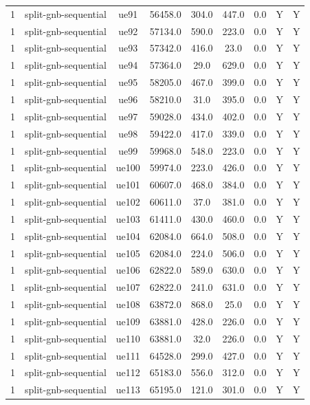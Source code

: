 \begin{table}[ht]
\begin{tabular}{|c|c|c|c|c|c|c|c|c|}
1 & split-gnb-sequential & ue91 & 56458.0 & 304.0 & 447.0 & 0.0 & Y & Y \\
1 & split-gnb-sequential & ue92 & 57134.0 & 590.0 & 223.0 & 0.0 & Y & Y \\
1 & split-gnb-sequential & ue93 & 57342.0 & 416.0 & 23.0 & 0.0 & Y & Y \\
1 & split-gnb-sequential & ue94 & 57364.0 & 29.0 & 629.0 & 0.0 & Y & Y \\
1 & split-gnb-sequential & ue95 & 58205.0 & 467.0 & 399.0 & 0.0 & Y & Y \\
1 & split-gnb-sequential & ue96 & 58210.0 & 31.0 & 395.0 & 0.0 & Y & Y \\
1 & split-gnb-sequential & ue97 & 59028.0 & 434.0 & 402.0 & 0.0 & Y & Y \\
1 & split-gnb-sequential & ue98 & 59422.0 & 417.0 & 339.0 & 0.0 & Y & Y \\
1 & split-gnb-sequential & ue99 & 59968.0 & 548.0 & 223.0 & 0.0 & Y & Y \\
1 & split-gnb-sequential & ue100 & 59974.0 & 223.0 & 426.0 & 0.0 & Y & Y \\
1 & split-gnb-sequential & ue101 & 60607.0 & 468.0 & 384.0 & 0.0 & Y & Y \\
1 & split-gnb-sequential & ue102 & 60611.0 & 37.0 & 381.0 & 0.0 & Y & Y \\
1 & split-gnb-sequential & ue103 & 61411.0 & 430.0 & 460.0 & 0.0 & Y & Y \\
1 & split-gnb-sequential & ue104 & 62084.0 & 664.0 & 508.0 & 0.0 & Y & Y \\
1 & split-gnb-sequential & ue105 & 62084.0 & 224.0 & 506.0 & 0.0 & Y & Y \\
1 & split-gnb-sequential & ue106 & 62822.0 & 589.0 & 630.0 & 0.0 & Y & Y \\
1 & split-gnb-sequential & ue107 & 62822.0 & 241.0 & 631.0 & 0.0 & Y & Y \\
1 & split-gnb-sequential & ue108 & 63872.0 & 868.0 & 25.0 & 0.0 & Y & Y \\
1 & split-gnb-sequential & ue109 & 63881.0 & 428.0 & 226.0 & 0.0 & Y & Y \\
1 & split-gnb-sequential & ue110 & 63881.0 & 32.0 & 226.0 & 0.0 & Y & Y \\
1 & split-gnb-sequential & ue111 & 64528.0 & 299.0 & 427.0 & 0.0 & Y & Y \\
1 & split-gnb-sequential & ue112 & 65183.0 & 556.0 & 312.0 & 0.0 & Y & Y \\
1 & split-gnb-sequential & ue113 & 65195.0 & 121.0 & 301.0 & 0.0 & Y & Y \\

\end{tabular}
\end{table}
